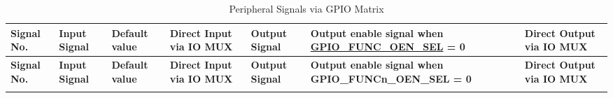 \begin{longtable}{|L{1.1cm}|L{3.5cm}|C{1.2cm}|C{2.5cm}|L{3cm}|L{4.5cm}|L{2.5cm}| }
    \caption{Peripheral Signals via GPIO Matrix}
    \label{tab:iomuxgpio-periph-signals-via-gpio-matrix} \\
    \hline
\textbf{Signal No.} & \textbf{Input Signal} & \textbf{Default value} & \textbf{Direct Input via IO MUX} & \textbf{Output Signal} & \textbf{Output enable signal when \hyperref[fielddesc:GPIOFUNCNOENSEL]{GPIO\_FUNC\_OEN\_SEL} = 0} & \textbf{Direct Output via IO MUX} \\
\hline
\endfirsthead
    \hline
\textbf{Signal No.} & \textbf{Input Signal} & \textbf{Default value} & \textbf{Direct Input via IO MUX} & \textbf{Output Signal} & \textbf{Output enable signal when GPIO\_FUNCn\_OEN\_SEL = 0} & \textbf{Direct Output via IO MUX} \\
    \hline
    \endhead
    \endfoot


\end{longtable}
